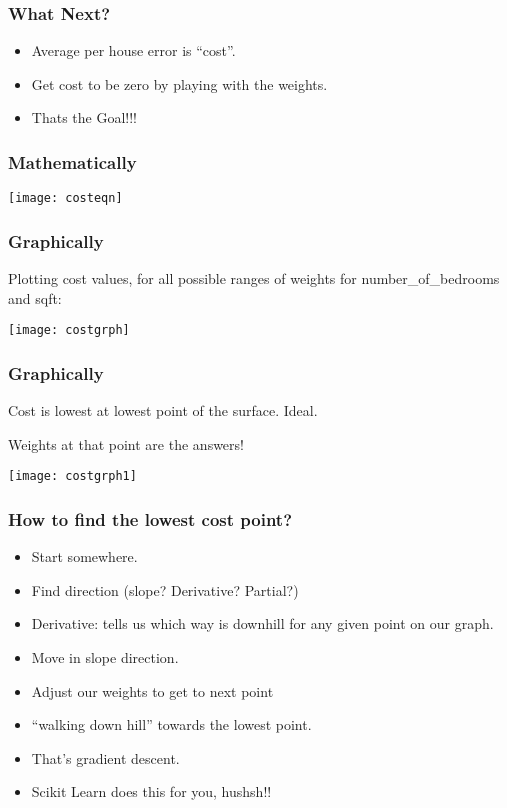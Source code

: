\begin{frame}[fragile]\frametitle{What Next?}
	\begin{itemize}
	\item Average per house error is ``cost''.
	\item Get cost to be zero by playing with the weights. 
	\item Thats the Goal!!!
	\end{itemize}
\end{frame}

\begin{frame}[fragile]\frametitle{Mathematically}
\begin{center}
\texttt{[image: costeqn]}
\end{center}
\end{frame}

\begin{frame}[fragile]\frametitle{Graphically}
Plotting cost values,  for all possible ranges of weights for number\_of\_bedrooms and sqft:
\begin{center}
\texttt{[image: costgrph]}
\end{center}
\end{frame}

\begin{frame}[fragile]\frametitle{Graphically}
Cost is lowest at lowest point of the surface. Ideal.

Weights at that point are the answers!
\begin{center}
\texttt{[image: costgrph1]}
\end{center}
\end{frame}


\begin{frame}[fragile]\frametitle{How to find the lowest cost point?}
	\begin{itemize}
	\item Start somewhere.
	\item Find direction (slope? Derivative? Partial?)
	\item Derivative: tells us which way is downhill for any given point on our graph. 
	\item Move in slope direction.
	\item Adjust our weights to get to next point
	\item ``walking down hill'' towards the lowest point.
	\item That's gradient descent. 
	\item Scikit Learn does this for you, hushsh!!
	\end{itemize}
\end{frame}

